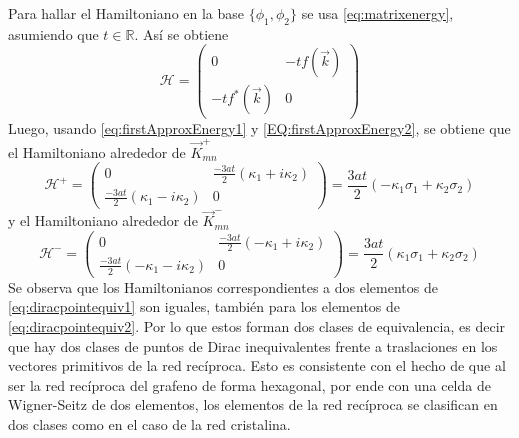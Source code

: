 Para hallar el Hamiltoniano en la base $\{\phi_1,\phi_2\}$ se usa \eqref{eq:matrixenergy}, asumiendo que $t \in \mathbb{R}$. Así se obtiene
\begin{equation}
	\mathcal{H} = \begin{pmatrix}
		0                   & -tf(\vec{k}) \\
		-tf^{\ast}(\vec{k}) & 0
	\end{pmatrix}\label{eq:reducedHamil}
\end{equation}
Luego, usando \eqref{eq:firstApproxEnergy1} y \eqref{EQ:firstApproxEnergy2}, se obtiene que el Hamiltoniano alrededor de $\vec{K}^{+}_{mn}$
\begin{equation}
	\mathcal{H}^{+} = \begin{pmatrix}
		0                                  & \frac{-3at}{2}(\kappa_1+i\kappa_2) \\
		\frac{-3at}{2}(\kappa_1-i\kappa_2) & 0
	\end{pmatrix} = \frac{3at}{2}\left(-\kappa_1\sigma_1+\kappa_2\sigma_2\right)\label{eq:diracHam1}
\end{equation}
y el Hamiltoniano alrededor de $\vec{K}^{-}_{mn}$
\begin{equation}
	\mathcal{H}^{-} = \begin{pmatrix}
		0                                   & \frac{-3at}{2}(-\kappa_1+i\kappa_2) \\
		\frac{-3at}{2}(-\kappa_1-i\kappa_2) & 0
	\end{pmatrix} = \frac{3at}{2}\left(\kappa_1\sigma_1+\kappa_2\sigma_2\right)\label{eq:diracHam2}
\end{equation}
Se observa que los Hamiltonianos correspondientes a dos elementos de \eqref{eq:diracpointequiv1} son iguales, también para los elementos de \eqref{eq:diracpointequiv2}. Por lo que estos forman dos clases de equivalencia, es decir que hay dos clases de puntos de Dirac inequivalentes frente a traslaciones en los vectores primitivos de la red recíproca. Esto es consistente con el hecho de que al ser la red recíproca del grafeno de forma hexagonal, por ende con una celda de Wigner-Seitz de dos elementos, los elementos de la red recíproca se clasifican en dos clases como en el caso de la red cristalina.\par
